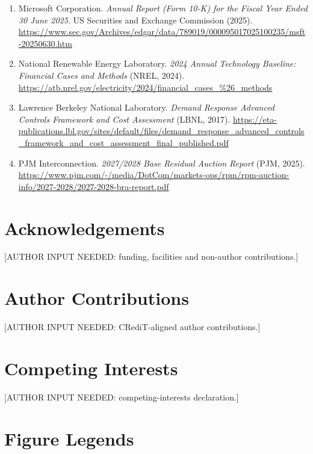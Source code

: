 \documentclass[10pt,a4paper]{article}
\begin{document}
{\begin{enumerate}[label=\arabic*.,leftmargin=*,itemsep=2.5pt]
\item Microsoft Corporation. \emph{Annual Report (Form 10-K) for the Fiscal Year Ended 30 June 2025}. US Securities and Exchange Commission (2025). \url{https://www.sec.gov/Archives/edgar/data/789019/000095017025100235/msft-20250630.htm}
\item National Renewable Energy Laboratory. \emph{2024 Annual Technology Baseline: Financial Cases and Methods} (NREL, 2024). \url{https://atb.nrel.gov/electricity/2024/financial_cases_\%26_methods}
\item Lawrence Berkeley National Laboratory. \emph{Demand Response Advanced Controls Framework and Cost Assessment} (LBNL, 2017). \url{https://eta-publications.lbl.gov/sites/default/files/demand_response_advanced_controls_framework_and_cost_assessment_final_published.pdf}
\item PJM Interconnection. \emph{2027/2028 Base Residual Auction Report} (PJM, 2025). \url{https://www.pjm.com/-/media/DotCom/markets-ops/rpm/rpm-auction-info/2027-2028/2027-2028-bra-report.pdf}
\end{enumerate}}
\section*{Acknowledgements}

[AUTHOR INPUT NEEDED: funding, facilities and non-author contributions.]


\section*{Author Contributions}

[AUTHOR INPUT NEEDED: CRediT-aligned author contributions.]


\section*{Competing Interests}

[AUTHOR INPUT NEEDED: competing-interests declaration.]


\clearpage
\section*{Figure Legends}
\small\setlength{\parskip}{3pt}
\end{document}
